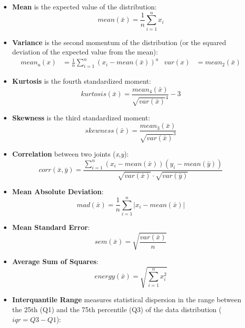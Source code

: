 \begin{itemize}
    \item \textbf{Mean} is the expected value of the distribution:
        \begin{equation}
            mean(\bar{x}) = \frac{1}{n} \sum_{i=1}^{n} x_i
        \end{equation}
    \item \textbf{Variance} is the second momentum of the distribution (or the squared deviation of the expected value from the mean):
        \begin{align}
            mean_a(x) &= \frac{1}{n} \sum_{i=1}^{n} (x_i - mean(\bar{x}))^a &
            var(x) &= mean_2(\bar{x})
        \end{align}
    \item \textbf{Kurtosis} is the fourth standardized moment:
        \begin{equation}
            kurtosis(\bar{x}) = \frac{mean_4(\bar{x})}{\sqrt{var(\bar{x})}^4} - 3
        \end{equation}
    \item \textbf{Skewness} is the third standardized moment:
        \begin{equation}
            skewness(\bar{x}) = \frac{mean_3(\bar{x})}{\sqrt{var(\bar{x})}^3}
        \end{equation}
    \item \textbf{Correlation} between two joints (\textit{x},\textit{y}):
        \begin{equation}
            corr(\bar{x},\bar{y}) = \frac{\sum_{i=1}^n (x_i - mean(\bar{x}))(y_i - mean(\bar{y}))}{\sqrt{var(\bar{x})}\cdot\sqrt{var(\bar{y})}}
        \end{equation}
    \item \textbf{Mean Absolute Deviation}:
        \begin{equation}
            mad(\bar{x}) = \frac{1}{n} \sum_{i=1}^{n} |x_i - mean(\bar{x})|
        \end{equation}
    \item \textbf{Mean Standard Error}:
        \begin{equation}
            sem(\bar{x}) = \sqrt{\frac{var(\bar{x})}{n}}
        \end{equation}
    \item \textbf{Average Sum of Squares}:
        \begin{equation}
            energy(\bar{x}) = \sqrt{\sum_{i=1}^{n} x_i^2}
        \end{equation}
    \item \textbf{Interquantile Range} measures statistical dispersion in the range between the 25th (Q1) and the 75th percentile (Q3) of the data distribution ($ iqr = Q3 - Q1 $):

\end{itemize}
